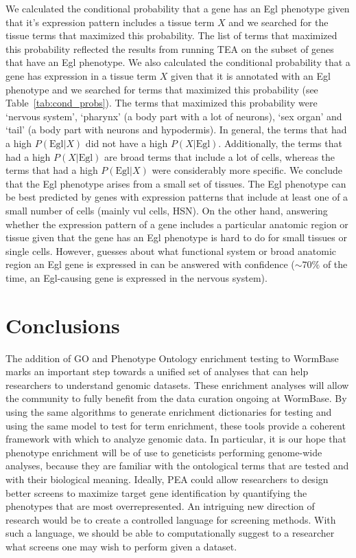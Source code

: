 \documentclass[10pt, onecolumn]{article}
\begin{document}
We calculated the conditional probability that a gene has an Egl phenotype given
that it's expression pattern includes a tissue term $X$ and we searched for the
tissue terms that maximized this probability. The list of terms that maximized
this probability reflected the results from running TEA on the subset of genes
that have an Egl phenotype. We also calculated the conditional probability that
a gene has expression in a tissue term $X$ given that it is annotated with an
Egl phenotype and we searched for terms that maximized this probability (see
Table~\ref{tab:cond_probs}). The terms that maximized this probability were
`nervous system', `pharynx' (a body part with a lot of neurons), `sex organ' and
`tail' (a body part with neurons and hypodermis). In general, the terms that had
a high $P(\text{Egl}|X)$ did not have a high $P(X|\text{Egl})$. Additionally,
the terms that had a high $P(X|\text{Egl})$ are broad terms that include a lot
of cells, whereas the terms that had a high $P(\text{Egl}|X)$ were considerably
more specific. We conclude that the Egl phenotype arises from a small set of
tissues. The Egl phenotype can be best predicted by genes with expression
patterns that include at least one of a small number of cells (mainly vul cells,
HSN). On the other hand, answering whether the expression pattern of a gene
includes a particular anatomic region or tissue given that the gene has an Egl
phenotype is hard to do for small tissues or single cells. However, guesses
about what functional system or broad anatomic region an Egl gene is expressed
in can be answered with confidence ($\sim70\%$ of the time, an Egl-causing gene
is expressed in the nervous system).

\section*{Conclusions}
The addition of GO and Phenotype Ontology enrichment testing to WormBase marks
an important step towards a unified set of analyses that can help researchers to
understand genomic datasets. These enrichment analyses will allow the community
to fully benefit from the data curation ongoing at WormBase. By using the same
algorithms to generate enrichment dictionaries for testing and using the same
model to test for term enrichment, these tools provide a coherent framework with
which to analyze genomic data. In particular, it is our hope that phenotype
enrichment will be of use to geneticists performing genome-wide analyses,
because they are familiar with the ontological terms that are tested and with
their biological meaning. Ideally, PEA could allow researchers to design better
screens to maximize target gene identification by quantifying the phenotypes
that are most overrepresented. An intriguing new direction of research would be
to create a controlled language for screening methods. With such a language, we
should be able to computationally suggest to a researcher what screens one may
wish to perform given a dataset.





\end{document}
